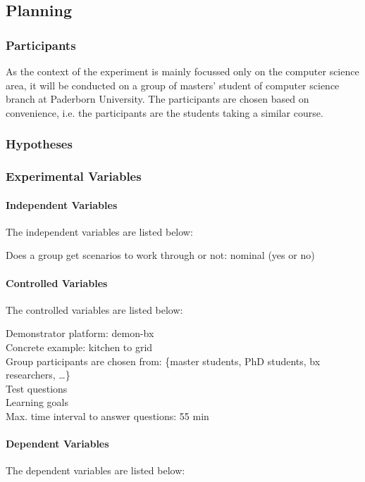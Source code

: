 \subsection{Planning}\label{subsec:planning}
\subsubsection{Participants}\label{subsubsec:participants}
As the context of the experiment is mainly focussed only on the computer science area, it will be conducted on a group of masters' student of computer science branch at Paderborn University. The participants are chosen based on convenience, i.e. the participants are the students taking a similar course.
\subsubsection{Hypotheses}\label{subsubsec:hypotheses} 

\subsubsection{Experimental Variables}\label{subsubsec:expvariables}

\paragraph{Independent Variables} The independent variables are listed below:

Does a group get scenarios to work through or not: nominal (yes or no)

\paragraph{Controlled Variables} The controlled variables are listed below:

Demonstrator platform: demon-bx\\
Concrete example: kitchen to grid\\
Group participants are chosen from: \{master students, PhD students, bx researchers, \ldots \}\\
Test questions\\
Learning goals\\
Max. time interval to answer questions: 55 min

\paragraph{Dependent Variables} The dependent variables are listed below:

